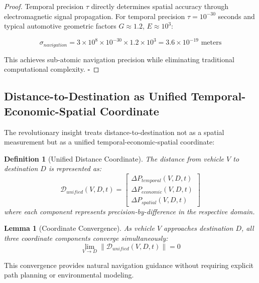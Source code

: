 \documentclass[12pt,a4paper]{article}
\newtheorem{lemma}[theorem]{Lemma}
\newtheorem{definition}[theorem]{Definition}
\begin{document}
\begin{proof}
Temporal precision $\tau$ directly determines spatial accuracy through electromagnetic signal propagation. For temporal precision $\tau = 10^{-30}$ seconds and typical automotive geometric factors $G \approx 1.2$, $E \approx 10^3$:

\begin{equation}
\sigma_{navigation} = 3 \times 10^8 \times 10^{-30} \times 1.2 \times 10^3 = 3.6 \times 10^{-19} \text{ meters}
\end{equation}

This achieves sub-atomic navigation precision while eliminating traditional computational complexity. $\square$
\end{proof}

\subsection{Distance-to-Destination as Unified Temporal-Economic-Spatial Coordinate}

The revolutionary insight treats distance-to-destination not as a spatial measurement but as a unified temporal-economic-spatial coordinate:

\begin{definition}[Unified Distance Coordinate]
The distance from vehicle $V$ to destination $D$ is represented as:
\begin{equation}
\mathcal{D}_{unified}(V,D,t) = \begin{bmatrix}
\Delta P_{temporal}(V,D,t) \\
\Delta P_{economic}(V,D,t) \\
\Delta P_{spatial}(V,D,t)
\end{bmatrix}
\end{equation}
where each component represents precision-by-difference in the respective domain.
\end{definition}

\begin{lemma}[Coordinate Convergence]
As vehicle $V$ approaches destination $D$, all three coordinate components converge simultaneously:
\begin{equation}
\lim_{V \rightarrow D} \|\mathcal{D}_{unified}(V,D,t)\| = 0
\end{equation}
\end{lemma}

This convergence provides natural navigation guidance without requiring explicit path planning or environmental modeling.
\end{document}
